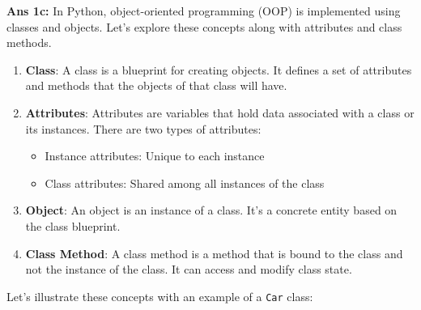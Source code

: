 \textbf{Ans 1c:} In Python, object-oriented programming (OOP) is
implemented using classes and objects. Let's explore these concepts
along with attributes and class methods.

\begin{enumerate}
\def\labelenumi{\arabic{enumi}.}
\item
  \textbf{Class}: A class is a blueprint for creating objects. It
  defines a set of attributes and methods that the objects of that class
  will have.
\item
  \textbf{Attributes}: Attributes are variables that hold data
  associated with a class or its instances. There are two types of
  attributes:

  \begin{itemize}
  \tightlist
  \item
    Instance attributes: Unique to each instance
  \item
    Class attributes: Shared among all instances of the class
  \end{itemize}
\item
  \textbf{Object}: An object is an instance of a class. It's a concrete
  entity based on the class blueprint.
\item
  \textbf{Class Method}: A class method is a method that is bound to the
  class and not the instance of the class. It can access and modify
  class state.
\end{enumerate}

Let's illustrate these concepts with an example of a \texttt{Car} class:

